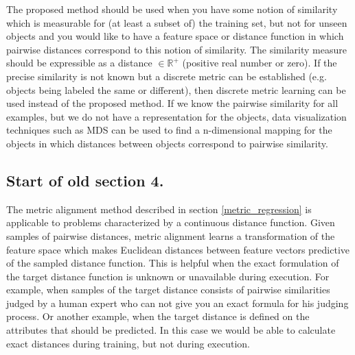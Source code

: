 The proposed method should be used when you have some notion of similarity which is measurable for (at least a subset of) the training set, but not for unseen objects and you would like to have a feature space or distance function in which pairwise distances correspond to this notion of similarity. The similarity measure should be expressible as a distance $\in \mathbb{R}^{+}$ (positive real number or zero). If the precise similarity is not known but a discrete metric can be established (e.g. objects being labeled the same or different), then discrete metric learning can be used instead of the proposed method. If we know the pairwise similarity for all examples, but we do not have a representation for the objects, data visualization techniques such as \ac{MDS} can be used to find a n-dimensional mapping for the objects in which distances between objects correspond to pairwise similarity.



\subsection*{Start of old section 4.}

The metric alignment method described in section \ref{metric_regression} is applicable to problems characterized by a continuous distance function. Given samples of pairwise distances, metric alignment learns a transformation of the feature space which makes Euclidean distances between feature vectors predictive of the sampled distance function. This is helpful when the exact formulation of the target distance function is unknown or unavailable during execution. For example, when samples of the target distance consists of pairwise similarities judged by a human expert who can not give you an exact formula for his judging process. Or another example, when the target distance is defined on the attributes that should be predicted. In this case we would be able to calculate exact distances during training, but not during execution.

